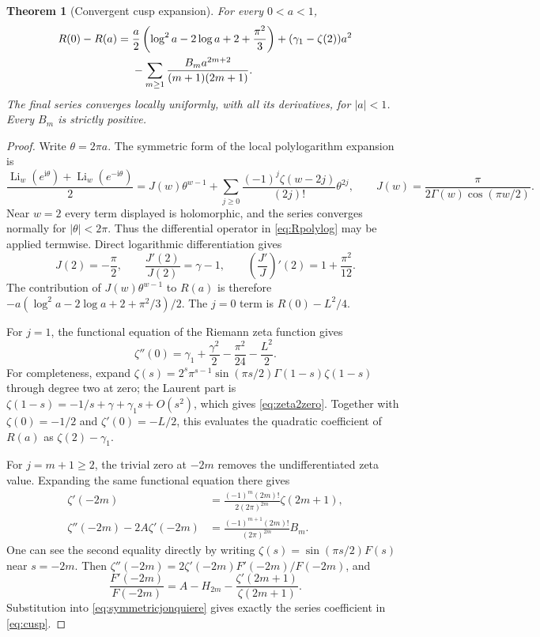 \documentclass[11pt]{article}
\numberwithin{equation}{section}
\newtheorem{theorem}{Theorem}[section]
\theoremstyle{definition}\newtheorem{definition}[theorem]{Definition}
\theoremstyle{remark}\newtheorem{remark}[theorem]{Remark}
\DeclareMathOperator{\Li}{Li}
\newcommand{\iu}{\mathrm i}
\begin{document}
\begin{theorem}[Convergent cusp expansion]\label{thm:cusp}
For every $0<a<1$,
\begin{align}\label{eq:cusp}
 R(0)-R(a)={}&\frac a2
       \left(\log^2a-2\log a+2+\frac{\pi^2}{3}\right)
       +(\gamma_1-\zeta(2))a^2\notag\\
       &-\sum_{m\ge1}\frac{B_m a^{2m+2}}{(m+1)(2m+1)}.
\end{align}
The final series converges locally uniformly, with all its derivatives,
for $|a|<1$. Every $B_m$ is strictly positive.
\end{theorem}
\begin{proof}
Write $\theta=2\pi a$. The symmetric form of the local polylogarithm
expansion \cite[25.12.12]{DLMFPolylog} is
\begin{equation}\label{eq:symmetricjonquiere}
 \frac{\Li_w(e^{\iu\theta})+\Li_w(e^{-\iu\theta})}{2}
 =J(w)\theta^{w-1}
   +\sum_{j\ge0}\frac{(-1)^j\zeta(w-2j)}{(2j)!}\theta^{2j},
 \qquad J(w)=\frac{\pi}{2\Gamma(w)\cos(\pi w/2)}.
\end{equation}
Near $w=2$ every term displayed is holomorphic, and the series converges
normally for $|\theta|<2\pi$. Thus the differential operator in
\eqref{eq:Rpolylog} may be applied termwise. Direct logarithmic
differentiation gives
\[
 J(2)=-\frac\pi2,\qquad
 \frac{J'(2)}{J(2)}=\gamma-1,\qquad
 \left(\frac{J'}J\right)'(2)=1+\frac{\pi^2}{12}.
\]
The contribution of $J(w)\theta^{w-1}$ to $R(a)$ is therefore
$-a(\log^2a-2\log a+2+\pi^2/3)/2$.
The $j=0$ term is $R(0)-L^2/4$.

For $j=1$, the functional equation of the Riemann zeta function
\cite[25.4.2]{DLMFZeta} gives
\begin{equation}\label{eq:zeta2zero}
 \zeta''(0)=\gamma_1+\frac{\gamma^2}{2}
                       -\frac{\pi^2}{24}-\frac{L^2}{2}.
\end{equation}
For completeness, expand
$\zeta(s)=2^s\pi^{s-1}\sin(\pi s/2)\Gamma(1-s)\zeta(1-s)$
through degree two at zero; the Laurent part is
$\zeta(1-s)=-1/s+\gamma+\gamma_1s+O(s^2)$, which gives
\eqref{eq:zeta2zero}. Together with $\zeta(0)=-1/2$ and
$\zeta'(0)=-L/2$, this evaluates the quadratic coefficient of $R(a)$
as $\zeta(2)-\gamma_1$.

For $j=m+1\ge2$, the trivial zero at $-2m$ removes the undifferentiated
zeta value. Expanding the same functional equation there gives
\begin{align}
 \zeta'(-2m)&=\frac{(-1)^m(2m)!}{2(2\pi)^{2m}}\zeta(2m+1),
       \label{eq:trivialfirst}\\
 \zeta''(-2m)-2A\zeta'(-2m)
   &=\frac{(-1)^{m+1}(2m)!}{(2\pi)^{2m}}B_m.
       \label{eq:trivialsecond}
\end{align}
One can see the second equality directly by writing
$\zeta(s)=\sin(\pi s/2)F(s)$ near $s=-2m$.
Then $\zeta''(-2m)=2\zeta'(-2m)F'(-2m)/F(-2m)$, and
\[
 \frac{F'(-2m)}{F(-2m)}
     =A-H_{2m}-\frac{\zeta'(2m+1)}{\zeta(2m+1)}.
\]
Substitution into \eqref{eq:symmetricjonquiere} gives exactly the series
coefficient in \eqref{eq:cusp}.


\end{proof}
\end{document}

